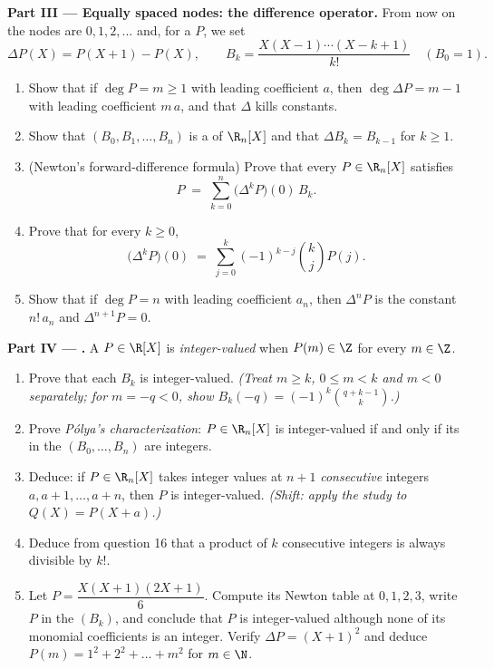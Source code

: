 \begin{problem}
\medskip
\noindent\textbf{Part III --- Equally spaced nodes: the difference
operator.} From now on the nodes are $0, 1, 2, \dots$ and, for a
 $P$, we set
\[
\Delta P(X) = P(X + 1) - P(X),
\qquad
B_k = \frac{X(X-1)\cdots(X-k+1)}{k!} \quad (B_0 = 1).
\]
\begin{enumerate}[resume]
  \item Show that if $\deg P = m \geq 1$ with leading coefficient
        $a$, then $\deg \Delta P = m - 1$ with leading coefficient
        $m\,a$, and that $\Delta$ kills constants.
  \item Show that $(B_0, B_1, \dots, B_n)$ is a  of
        $\R_n[X]$ and that $\Delta B_k = B_{k-1}$ for $k \geq 1$.
  \item (Newton's forward-difference formula) Prove that every $P
        \in \R_n[X]$ satisfies
        \[
        P \;=\; \sum_{k=0}^{n} \bigl(\Delta^{k} P\bigr)(0)\, B_k .
        \]
  \item Prove that for every $k \geq 0$,
        \[
        \bigl(\Delta^{k} P\bigr)(0) \;=\;
        \sum_{j=0}^{k} (-1)^{k-j} \binom{k}{j} P(j) .
        \]
  \item Show that if $\deg P = n$ with leading coefficient $a_n$,
        then $\Delta^{n} P$ is the constant $n!\,a_n$ and
        $\Delta^{n+1} P = 0$.
\end{enumerate}

\medskip
\noindent\textbf{Part IV --- .} A
 $P \in \R[X]$ is \emph{integer-valued} when $P(m) \in
\Z$ for every $m \in \Z$.
\begin{enumerate}[resume]
  \item Prove that each $B_k$ is integer-valued. \emph{(Treat $m
        \geq k$, $0 \leq m < k$ and $m < 0$ separately; for $m =
        -q < 0$, show $B_k(-q) = (-1)^k \binom{q + k - 1}{k}$.)}
  \item Prove \emph{P\'olya's characterization}: $P \in \R_n[X]$
        is integer-valued if and only if its  in the
         $(B_0, \dots, B_n)$ are integers.
  \item Deduce: if $P \in \R_n[X]$ takes integer values at $n + 1$
        \emph{consecutive} integers $a, a+1, \dots, a+n$, then $P$
        is integer-valued. \emph{(Shift: apply the study to $Q(X)
        = P(X + a)$.)}
  \item Deduce from question 16 that a product of $k$ consecutive
        integers is always divisible by $k!$.
  \item Let $P = \dfrac{X(X+1)(2X+1)}{6}$. Compute its Newton
        table at $0, 1, 2, 3$, write $P$ in the  $(B_k)$, and
        conclude that $P$ is integer-valued although none of its
        monomial coefficients is an integer. Verify $\Delta P =
        (X+1)^2$ and deduce $P(m) = 1^2 + 2^2 + \dots + m^2$ for
        $m \in \N$.
\end{enumerate}


\end{problem}
